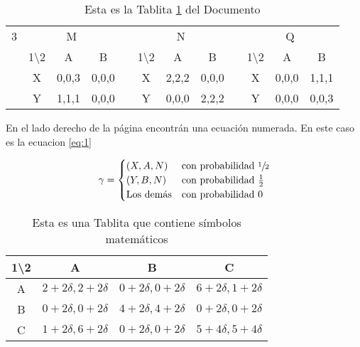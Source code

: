 \documentclass[12pt]{article}
\begin{document}
\begin{table}[h!]
    \centering
    \caption{Esta es la Tablita \ref{tab:1} del Documento}
    \begin{tabular}{c *{3}{c} c *{3}{c} c *{3}{c}}\cmidrule[1pt]{2-4}\cmidrule[1pt]{6-8}\cmidrule[1pt]{10-12}
          \multicolumn{1}{c}{3} & \multicolumn{3}{c}{M}&\multirow{4}{*}{}& \multicolumn{3}{c}{N} &\multirow{4}{*}{}& \multicolumn{3}{c}{Q}\\\cmidrule{2-4}\cmidrule{6-8}\cmidrule{10-12}
          & 1\textbackslash 2 & A & B && 1\textbackslash 2 & A & B && 1\textbackslash 2 & A & B \\\cmidrule{2-4}\cmidrule{6-8}\cmidrule{10-12}
          & X & 0,0,3 & 0,0,0 & & X & 2,2,2 & 0,0,0 & &X & 0,0,0 & 1,1,1 \\  
          & Y & 1,1,1 & 0,0,0 & & Y & 0,0,0 & 2,2,2 & & Y & 0,0,0 & 0,0,3 \\ \cmidrule[1pt]{2-4}\cmidrule[1pt]{6-8}\cmidrule[1pt]{10-12} 
    \end{tabular} 
    \label{tab:1}
\end{table}
 
 \begin{minipage}{0.4\linewidth}
 En el lado derecho de la página encontrán una ecuación numerada. En este caso es la ecuacion \ref{eq:1}
 \end{minipage}
 \begin{minipage}{0.6\linewidth}
 \begin{equation}
 \gamma = \begin{cases} (X,A,N) & \text{con probabilidad }\sfrac{1}{2} \\
 (Y,B,N) & \text{con probabilidad }\frac{1}{2} \\
 \text{Los demás} & \text{con probabilidad } 0 \\ \end{cases}
 \label{eq:1}
 \end{equation}
 \end{minipage}
 
 \begin{table}[h!]
 \centering
     \begin{tabular}{|c|c|c|c|}\hline
      1\textbackslash 2 & A & B & C \\ \hline
      A & $2+2\delta,2+2\delta$ & $0+2\delta,0+2\delta$ & $6+2\delta,1+2\delta$ \\ \hline
      B & $0+2\delta,0+2\delta$ & $4+2\delta,4+2\delta$ & $0+2\delta,0+2\delta$ \\ \hline
      C & $1+2\delta,6+2\delta$ & $0+2\delta,0+2\delta$ & $5+4\delta,5+4\delta$ \\ \hline
    \end{tabular}
     \caption{Esta es una Tablita que contiene símbolos matemáticos}
     \label{tab:2}
 \end{table}
 
\end{document}
